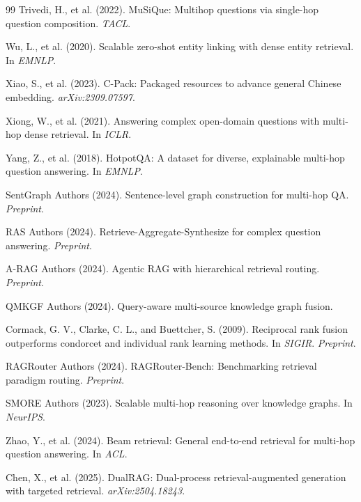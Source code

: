 \documentclass[11pt,a4paper]{article}
\begin{document}
\begin{thebibliography}{99}
Trivedi, H., et al. (2022).
MuSiQue: Multihop questions via single-hop question composition.
\textit{TACL}.

Wu, L., et al. (2020).
Scalable zero-shot entity linking with dense entity retrieval.
In \textit{EMNLP}.

Xiao, S., et al. (2023).
C-Pack: Packaged resources to advance general Chinese embedding.
\textit{arXiv:2309.07597}.

Xiong, W., et al. (2021).
Answering complex open-domain questions with multi-hop dense retrieval.
In \textit{ICLR}.

Yang, Z., et al. (2018).
HotpotQA: A dataset for diverse, explainable multi-hop question answering.
In \textit{EMNLP}.

SentGraph Authors (2024).
Sentence-level graph construction for multi-hop QA.
\textit{Preprint}.

RAS Authors (2024).
Retrieve-Aggregate-Synthesize for complex question answering.
\textit{Preprint}.

A-RAG Authors (2024).
Agentic RAG with hierarchical retrieval routing.
\textit{Preprint}.

QMKGF Authors (2024).
Query-aware multi-source knowledge graph fusion.

Cormack, G. V., Clarke, C. L., and Buettcher, S. (2009).
Reciprocal rank fusion outperforms condorcet and individual rank learning methods.
In \textit{SIGIR}.
\textit{Preprint}.

RAGRouter Authors (2024).
RAGRouter-Bench: Benchmarking retrieval paradigm routing.
\textit{Preprint}.

SMORE Authors (2023).
Scalable multi-hop reasoning over knowledge graphs.
In \textit{NeurIPS}.

Zhao, Y., et al. (2024).
Beam retrieval: General end-to-end retrieval for multi-hop question answering.
In \textit{ACL}.

Chen, X., et al. (2025).
DualRAG: Dual-process retrieval-augmented generation with targeted retrieval.
\textit{arXiv:2504.18243}.


\end{thebibliography}
\end{document}
